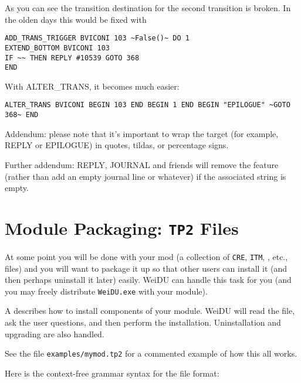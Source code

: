 \documentclass{article}
\def\ttref#1{\ahrefloc{#1}{\tt #1}}
\def\DEFINE#1{{\tt \bf #1}\label{#1}\index{#1}}
\def\t#1{{\tt #1}}
\begin{document}
As you can see the transition destination for the second transition is broken. In the olden days this would be fixed with

\begin{verbatim}
ADD_TRANS_TRIGGER BVICONI 103 ~False()~ DO 1
EXTEND_BOTTOM BVICONI 103
IF ~~ THEN REPLY #10539 GOTO 368
END
\end{verbatim}


With ALTER_TRANS, it becomes much easier:

\begin{verbatim}
ALTER_TRANS BVICONI BEGIN 103 END BEGIN 1 END BEGIN "EPILOGUE" ~GOTO 368~ END
\end{verbatim}

Addendum: please note that it's important to wrap the target (for example, REPLY or EPILOGUE)
in quotes, tildas, or percentage signs.

Further addendum: REPLY, JOURNAL and friends will remove the feature (rather than add an empty
journal line or whatever) if the associated string is empty.



\section{Module Packaging: \DEFINE{TP2} Files}
\label{TP}

At some point you will be done with your mod (a collection of \t{CRE},
\t{ITM}, \ttref{D}, etc., files) and you will want to package it up so that
other users can install it (and then perhaps uninstall it later) easily.
WeiDU can handle this task for you (and you may freely distribute \t{WeiDU.exe}
with your module).

A \ttref{TP2} describes how to install components of your module. WeiDU
will read the file, ask the user questions, and then perform the
installation. Uninstallation and upgrading are also handled. 

See the file \t{examples/mymod.tp2} for a commented example of how this all
works.

Here is the context-free grammar syntax for the \ttref{TP2} file format:
\end{document}
